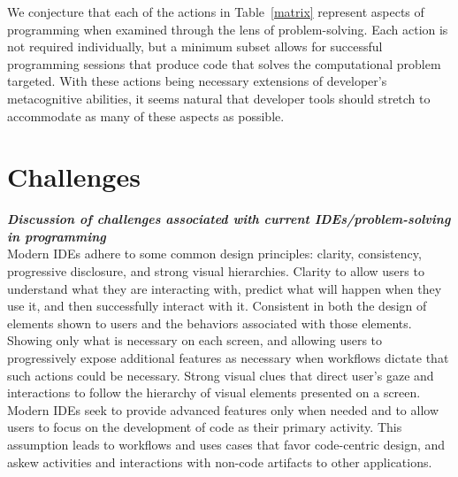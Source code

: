 \documentclass{ppig}
\newcommand{\bold}[1]{\textit{\textbf{\color{aoblue}#1}}}
\begin{document}
We conjecture that each of the actions in Table~\ref{matrix} represent aspects of programming when examined through the lens of problem-solving.
Each action is not required individually, but a minimum subset allows for successful programming sessions that produce code that solves the computational problem targeted.
With these actions being necessary extensions of developer's metacognitive abilities, it seems natural that developer tools should stretch to accommodate as many of these aspects as possible.

\section{Challenges}
\bold{Discussion of challenges associated with current IDEs/problem-solving in programming\\}
Modern IDEs adhere to some common design principles: clarity, consistency, progressive disclosure, and strong visual hierarchies.
Clarity to allow users to understand what they are interacting with, predict what will happen when they use it, and then successfully interact with it.
Consistent in both the design of elements shown to users and the behaviors associated with those elements.
Showing only what is necessary on each screen, and allowing users to progressively expose additional features as necessary when workflows dictate that such actions could be necessary.
Strong visual clues that direct user's gaze and interactions to follow the hierarchy of visual elements presented on a screen.
Modern IDEs seek to provide advanced features only when needed and to allow users to focus on the development of code as their primary activity.
This assumption leads to workflows and uses cases that favor code-centric design, and askew activities and interactions with non-code artifacts to other applications.
\end{document}

